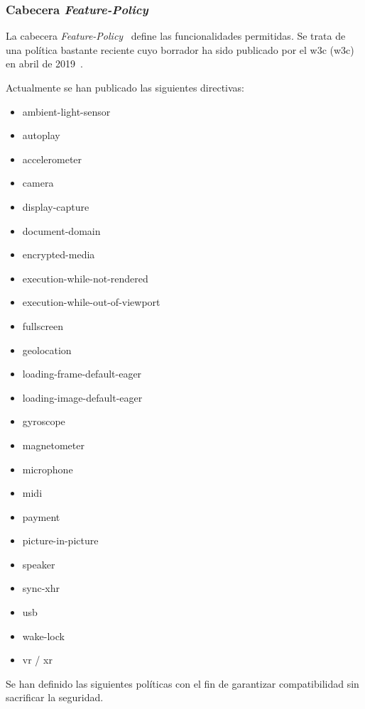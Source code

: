 \subsubsection{Cabecera {\em Feature-Policy}}
\par La cabecera {\em Feature-Policy}~\cite{FeaturePolicy} define las funcionalidades permitidas. Se trata de una política bastante reciente cuyo borrador ha sido publicado por el \acrshort{w3c} (\acrlong{w3c}) en abril de 2019~\cite{FeaturePolicyDraft}.
\par Actualmente se han publicado las siguientes directivas:
\begin{multicols}{2}
\begin{itemize}
	\item ambient-light-sensor
	\item autoplay
	\item accelerometer
	\item camera
	\item display-capture
	\item document-domain
	\item encrypted-media
	\item execution-while-not-rendered
	\item execution-while-out-of-viewport
	\item fullscreen
	\item geolocation
	\item loading-frame-default-eager
	\item loading-image-default-eager
	\item gyroscope
	\item magnetometer
	\item microphone
	\item midi
	\item payment
	\item picture-in-picture
	\item speaker
	\item sync-xhr
	\item usb
	\item wake-lock
	\item vr / xr
\end{itemize}
\end{multicols}

\par Se han definido las siguientes políticas con el fin de garantizar compatibilidad sin sacrificar la seguridad. \\
\begin{minipage}{\linewidth}
  
\end{minipage}

